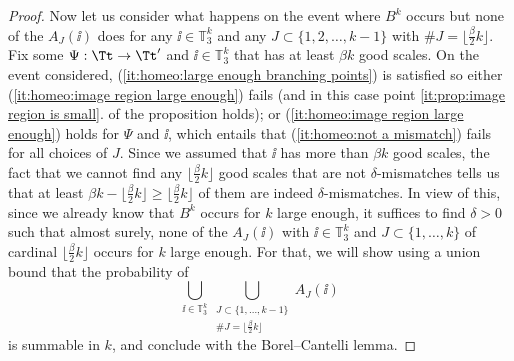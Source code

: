\begin{proof}
Now let us consider what happens on the event where $B^k$ occurs but none of the $A_J(\ii)$ does for any $\ii \in \mathbb{T}_3^k$ and any $J\subset \{ 1,2,\dots, k-1\}$ with $\#J=\lfloor \frac{\beta}{2} k \rfloor$.
Fix some $\Psi:\Tt\rightarrow \Tt'$ and $\ii \in \mathbb{T}_3^k$ that has at least $\beta k$ good scales.
On the event considered, (\ref{it:homeo:large enough branching points}) is satisfied so either (\ref{it:homeo:image region large enough}) fails (and in this case point \ref{it:prop:image region is small}. of the proposition holds); or (\ref{it:homeo:image region large enough}) holds for $\Psi$ and $\ii$, which entails that (\ref{it:homeo:not a mismatch}) fails for all choices of $J$.
Since we assumed that $\ii$ has more than $\beta k$ good scales, the fact that we cannot find any $\lfloor \frac{\beta}{2}k\rfloor$ good scales that are not $\delta$-mismatches tells us that at least $\beta k - \lfloor \frac{\beta}{2}k\rfloor\geq \lfloor\frac{\beta}{2}k\rfloor$ of them are indeed $\delta$-mismatches.
In view of this, since we already know that $B^k$ occurs for $k$ large enough, it suffices to find $\delta>0$ such that almost surely, none of the $A_J(\ii)$ with $\ii \in \mathbb{T}_3^k$ and $J \subset \{1,\dots,k\}$ of cardinal $\lfloor \frac{\beta}{2}k \rfloor$ occurs for $k$ large enough. For that, we will show using a union bound that the probability of
\begin{equation}\label{eqn_rewriting_event_Aij}
\bigcup_{\ii \in \mathbb{T}_3^k} \bigcup_{\substack{J \subset \{1,\dots,k-1\}\\ \#J=\lfloor\frac{\beta}{2} k\rfloor }} A_J(\ii)
\end{equation}
is summable in $k$, and conclude with the Borel--Cantelli lemma.


\end{proof}
